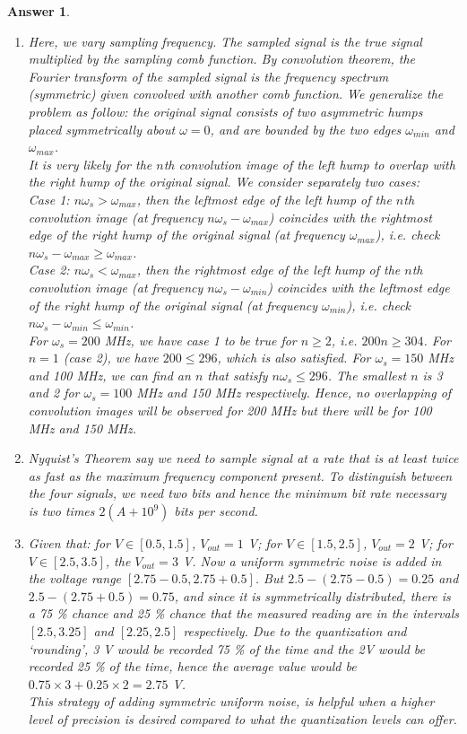 \documentclass[a4paper]{article}
\newtheorem{ans}{Answer}[section]
\theoremstyle{new}
\begin{document}
\begin{ans}\leavevmode
\begin{enumerate}[label=(\alph*)]
\item Here, we vary sampling frequency. The sampled signal is the true signal multiplied by the sampling comb function. By convolution theorem, the Fourier transform of the sampled signal is the frequency spectrum (symmetric) given convolved with another comb function. We generalize the problem as follow: the original signal consists of two asymmetric humps placed symmetrically about $\omega=0$, and are bounded by the two edges $\omega_{min}$ and $\omega_{max}$.\\[5pt]
It is very likely for the $n$th convolution image of the left hump to overlap with the right hump of the original signal. We consider separately two cases:\\[5pt]
Case 1: $n\omega_s>\omega_{max}$, then the leftmost edge of the left hump of the $n$th convolution image (at frequency $n\omega_s-\omega_{max}$) coincides with the rightmost edge of the right hump of the original signal (at frequency $\omega_{max}$), i.e. check $n\omega_s-\omega_{max}\geq\omega_{max}$.\\[5pt]
Case 2: $n\omega_s<\omega_{max}$, then the rightmost edge of the left hump of the $n$th convolution image (at frequency $n\omega_s-\omega_{min}$) coincides with the leftmost edge of the right hump of the original signal (at frequency $\omega_{min}$), i.e. check $n\omega_s-\omega_{min}\leq\omega_{min}$.\\[5pt]
For $\omega_s=200$ MHz, we have case 1 to be true for $n\geq 2$, i.e. $200n\geq304$. For $n=1$ (case 2), we have $200\leq 296$, which is also satisfied. For $\omega_s=150$ MHz and 100 MHz, we can find an $n$ that satisfy $n\omega_s\leq 296$. The smallest $n$ is 3 and 2 for $\omega_s=100$ MHz and 150 MHz respectively. Hence, no overlapping of convolution images will be observed for 200 MHz but there will be for 100 MHz and 150 MHz.
\newpage
\item Nyquist's Theorem say we need to sample signal at a rate that is at least twice as fast as the maximum frequency component present. To distinguish between the four signals, we need two bits and hence the minimum bit rate necessary is two times $2(A+10^9)$ bits per second. 
\item Given that: for $V\in[0.5,1.5]$, $V_{out}=1$ V; for $V\in[1.5,2.5]$, $V_{out}=2$ V; for $V\in[2.5,3.5]$, the $V_{out}=3$ V. Now a uniform symmetric noise is added in the voltage range $[2.75-0.5,2.75+0.5]$. But $2.5-(2.75-0.5)=0.25$ and $2.5-(2.75+0.5)=0.75$, and since it is symmetrically distributed, there is a 75 \% chance and 25 \% chance that the measured reading are in the intervals $[2.5,3.25]$ and $[2.25,2.5]$ respectively. Due to the quantization and `rounding', 3 V would be recorded 75 \% of the time and the 2V would be recorded 25 \% of the time, hence the average value would be $0.75\times 3+0.25\times 2=2.75$ V.\\[5pt]
This strategy of adding symmetric uniform noise, is helpful when a higher level of precision is desired compared to what the quantization levels can offer. 
\end{enumerate}
\end{ans}
\end{document}
